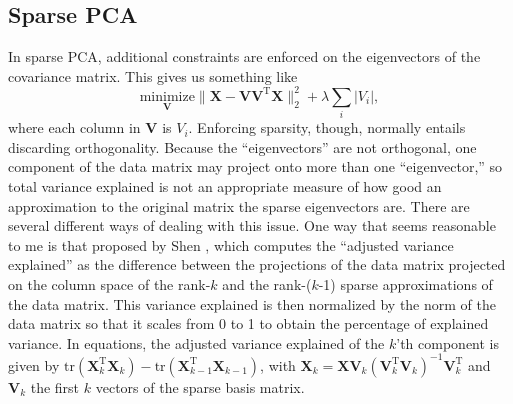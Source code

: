 \documentclass{article}
\begin{document}
\subsection*{Sparse PCA}
In sparse PCA, additional constraints are enforced on the eigenvectors of the covariance matrix.  This gives us something like 
\begin{equation}
\underset{\mathbf{V}}{\text{minimize}} \| \mathbf{X} - \mathbf{VV}^{\mathrm{T}}\mathbf{X}\|_2^2  + \lambda \sum_i \vert V_i \vert,
\end{equation}
where each column in $\mathbf{V}$ is $V_i$. Enforcing sparsity, though, normally entails discarding orthogonality.  Because the ``eigenvectors'' are not orthogonal, one component of the data matrix may project onto more than one ``eigenvector,'' so total variance explained is not an appropriate measure of how good an approximation to the original matrix the sparse eigenvectors are.  There are several different ways of dealing with this issue.  One way that seems reasonable to me is that proposed by Shen \cite{shen_sparse_2008}, which computes the ``adjusted variance explained'' as the difference between the projections of the data matrix projected on the column space of the rank-$k$ and the rank-($k$-1) sparse approximations of the data matrix.  This variance explained is then normalized by the norm of the data matrix so that it scales from 0 to 1 to obtain the percentage of explained variance.  In equations, the adjusted variance explained of the $k$'th component is given by $\text{tr} \left( \mathbf{X}_k^{\mathrm{T}} \mathbf{X}_k\right)  - \text{tr}\left(\mathbf{X}_{k-1}^{\mathrm{T}}\mathbf{X}_{k-1}\right)$, with $\mathbf{X}_k=\mathbf{XV}_k\left(\mathbf{V}_k^\mathrm{T}\mathbf{V}_k\right)^{-1}\mathbf{V}_k^\mathrm{T}$ and $\mathbf{V}_k$ the first $k$ vectors of the sparse basis matrix. 
\end{document}
